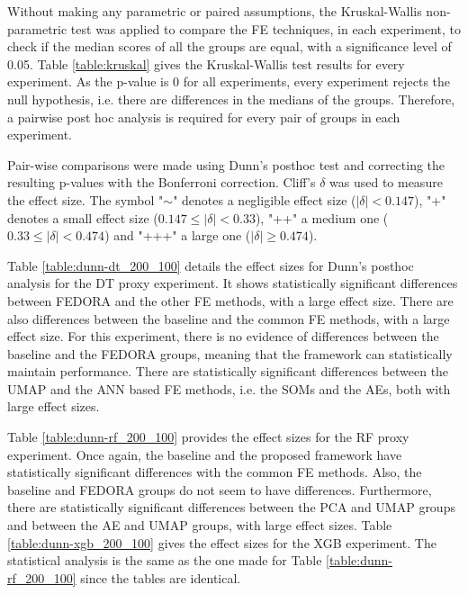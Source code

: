 \setlength{\tabcolsep}{0.5em} %
{\renewcommand{\arraystretch}{1}%
Without making any parametric or paired assumptions, the Kruskal-Wallis non-parametric test was applied to compare the \gls{FE} techniques, in each experiment, to check if the median scores of all the groups are equal, with a significance level of 0.05. Table \ref{table:kruskal} gives the Kruskal-Wallis test results for every experiment. As the p-value is 0 for all experiments, every experiment rejects the null hypothesis, i.e. there are differences in the medians of the groups. Therefore, a pairwise post hoc analysis is required for every pair of groups in each experiment. 

Pair-wise comparisons were made using Dunn's posthoc test and correcting the resulting p-values with the Bonferroni correction. Cliff's $\delta$ was used to measure the effect size. The symbol "$\sim$" denotes a negligible effect size ($|\delta| < 0.147$), "+" denotes a small effect size ($0.147 \le |\delta| < 0.33$), "++" a medium one ($0.33 \le |\delta| < 0.474$) and "+++" a large one ($|\delta| \ge 0.474$). 


Table \ref{table:dunn-dt_200_100} details the effect sizes for Dunn's posthoc analysis for the \gls{DT} proxy experiment. It shows statistically significant differences between FEDORA and the other \gls{FE} methods, with a large effect size. There are also differences between the baseline and the common \gls{FE} methods, with a large effect size. For this experiment, there is no evidence of differences between the baseline and the FEDORA groups, meaning that the framework can statistically maintain performance. There are statistically significant differences between the \gls{UMAP} and the \gls{ANN} based \gls{FE} methods, i.e. the \glspl{SOM} and the \glspl{AE}, both with large effect sizes.

Table \ref{table:dunn-rf_200_100} provides the effect sizes for the \gls{RF} proxy experiment. Once again, the baseline and the proposed framework have statistically significant differences with the common \gls{FE} methods. Also, the baseline and FEDORA groups do not seem to have differences. Furthermore, there are statistically significant differences between the \gls{PCA} and \gls{UMAP} groups and between the \gls{AE} and \gls{UMAP} groups, with large effect sizes. Table \ref{table:dunn-xgb_200_100} gives the effect sizes for the \gls{XGB} experiment. The statistical analysis is the same as the one made for Table \ref{table:dunn-rf_200_100} since the tables are identical.

}
